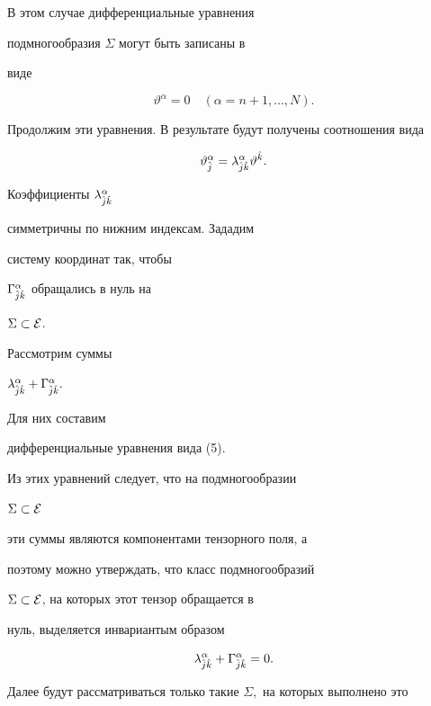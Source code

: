 В этом случае дифференциальные уравнения 


подмногообразия $\Sigma$ могут быть записаны в


виде


\begin{equation}


\vartheta^\alpha=0 \quad (\alpha=n+1,\dotsc,N).


\end{equation}





Продолжим эти уравнения. В результате будут получены соотношения вида


\begin{equation}


\vartheta^\alpha_{\Hat{j}}=\lambda^\alpha_{\Hat{j}\Hat{k}}


\vartheta^{\Hat{k}}.


\end{equation}


Коэффициенты $\lambda^\alpha_{\Hat{j}\Hat{k}}$ 


симметричны по нижним индексам. Зададим


систему координат так, чтобы


$\Gamma^\alpha_{\Hat{j}\Hat{k}}$ обращались в нуль на


$\Sigma\subset \cal E$.


Рассмотрим суммы


$\lambda^\alpha_{\Hat{j}\Hat{k}}+\Gamma^\alpha_{\Hat{j}\Hat{k}}.$


Для них составим


дифференциальные уравнения вида (5).


Из этих уравнений следует, что на подмногообразии


$\Sigma\subset\cal E$


эти суммы являются компонентами тензорного поля, а


поэтому можно утверждать, что класс подмногообразий


$\Sigma\subset\cal E$, на которых этот тензор обращается в


нуль, выделяется инвариантым образом


\begin{equation}


\lambda^\alpha_{\Hat{j}\Hat{k}}+\Gamma^\alpha_{\Hat{j}\Hat{k}}=0.


\end{equation}


Далее будут рассматриваться только такие $\Sigma,$ на которых выполнено это


